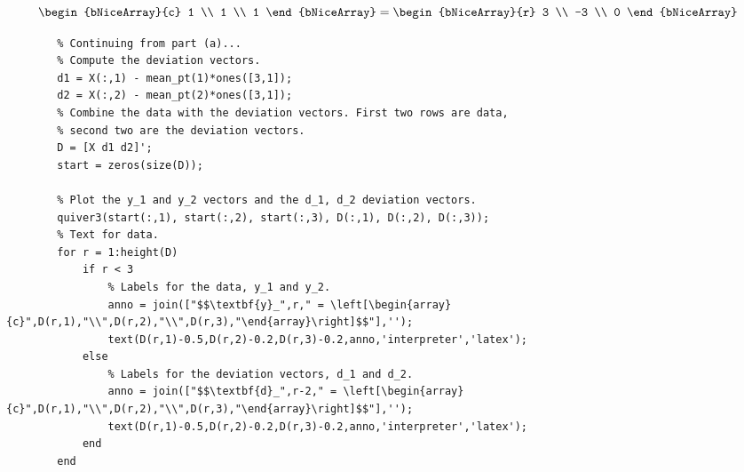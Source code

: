\begin{enumerate}[label=(\alph*)]
\[\begin{bNiceArray}{c}
            1 \\
            1 \\
            1
        \end{bNiceArray}
        =
        \begin{bNiceArray}{r}
            3 \\
            -3 \\
            0
        \end{bNiceArray}
    \]
    \begin{lstlisting}
        % Continuing from part (a)...
        % Compute the deviation vectors.
        d1 = X(:,1) - mean_pt(1)*ones([3,1]);
        d2 = X(:,2) - mean_pt(2)*ones([3,1]);
        % Combine the data with the deviation vectors. First two rows are data,
        % second two are the deviation vectors.
        D = [X d1 d2]';
        start = zeros(size(D));
        
        % Plot the y_1 and y_2 vectors and the d_1, d_2 deviation vectors.
        quiver3(start(:,1), start(:,2), start(:,3), D(:,1), D(:,2), D(:,3));
        % Text for data.
        for r = 1:height(D)
            if r < 3
                % Labels for the data, y_1 and y_2.
                anno = join(["$$\textbf{y}_",r," = \left[\begin{array}{c}",D(r,1),"\\",D(r,2),"\\",D(r,3),"\end{array}\right]$$"],'');
                text(D(r,1)-0.5,D(r,2)-0.2,D(r,3)-0.2,anno,'interpreter','latex');
            else
                % Labels for the deviation vectors, d_1 and d_2.
                anno = join(["$$\textbf{d}_",r-2," = \left[\begin{array}{c}",D(r,1),"\\",D(r,2),"\\",D(r,3),"\end{array}\right]$$"],'');
                text(D(r,1)-0.5,D(r,2)-0.2,D(r,3)-0.2,anno,'interpreter','latex');
            end
        end
    \end{lstlisting}


\end{enumerate}
